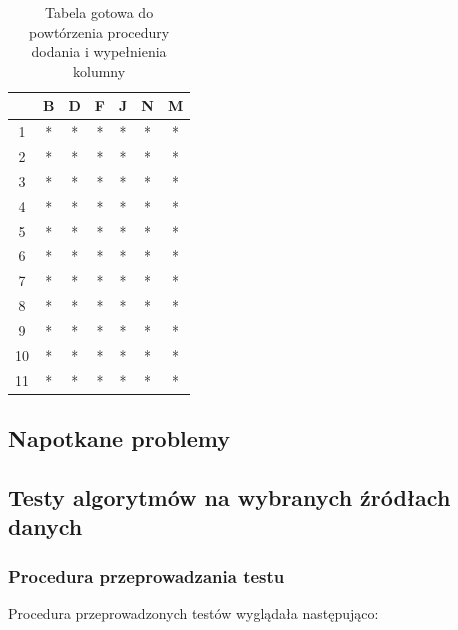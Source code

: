 \documentclass[12pt,twoside]{article}
\begin{document}
\begin{enumerate}[label=\arabic*), leftmargin=1.25cm]
          \begin{table}[ht]
              \caption{Tabela gotowa do powtórzenia procedury dodania i wypełnienia kolumny}
              \centering
              \begin{tabular}{|c|c|c|c|c|c|c|}
                  \hline
                     & B & D & F & J & N & M \\ \hline
                  1  & * & * & * & * & * & * \\ \hline
                  2  & * & * & * & * & * & * \\ \hline
                  3  & * & * & * & * & * & * \\ \hline
                  4  & * & * & * & * & * & * \\ \hline
                  5  & * & * & * & * & * & * \\ \hline
                  6  & * & * & * & * & * & * \\ \hline
                  7  & * & * & * & * & * & * \\ \hline
                  8  & * & * & * & * & * & * \\ \hline
                  9  & * & * & * & * & * & * \\ \hline
                  10 & * & * & * & * & * & * \\ \hline
                  11 & * & * & * & * & * & * \\ \hline
              \end{tabular}
              \label{tab:3_end}
          \end{table}
          \FloatBarrier
\end{enumerate}

\subsection{Napotkane problemy}
\subsection{Testy algorytmów na wybranych źródłach danych}

\subsubsection{Procedura przeprowadzania testu}

Procedura przeprowadzonych testów wyglądała następująco:
\end{document}
